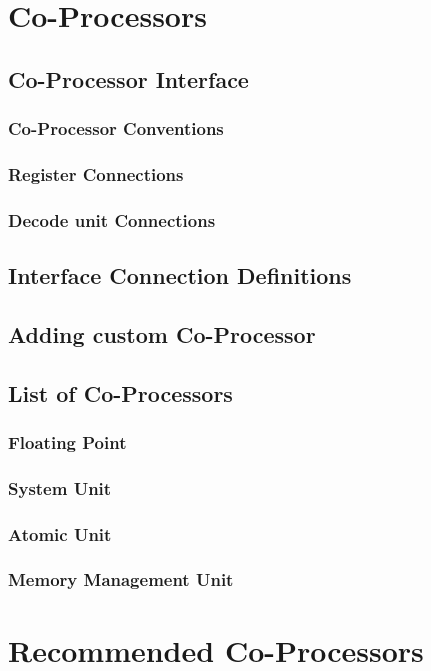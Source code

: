 \documentclass[letterpaper, 11pt]{article}
\begin{document}
\section{Co-Processors}
\subsection{Co-Processor Interface}
\subsubsection{Co-Processor Conventions}
\subsubsection{Register Connections}
\subsubsection{Decode unit Connections}
\subsection{Interface Connection Definitions}
\subsection{Adding custom Co-Processor}
\subsection{List of Co-Processors}
\subsubsection{Floating Point}
\subsubsection{System Unit}
\subsubsection{Atomic Unit}
\subsubsection{Memory Management Unit}
\subsubsection{}

\section{Recommended Co-Processors}
\end{document}
